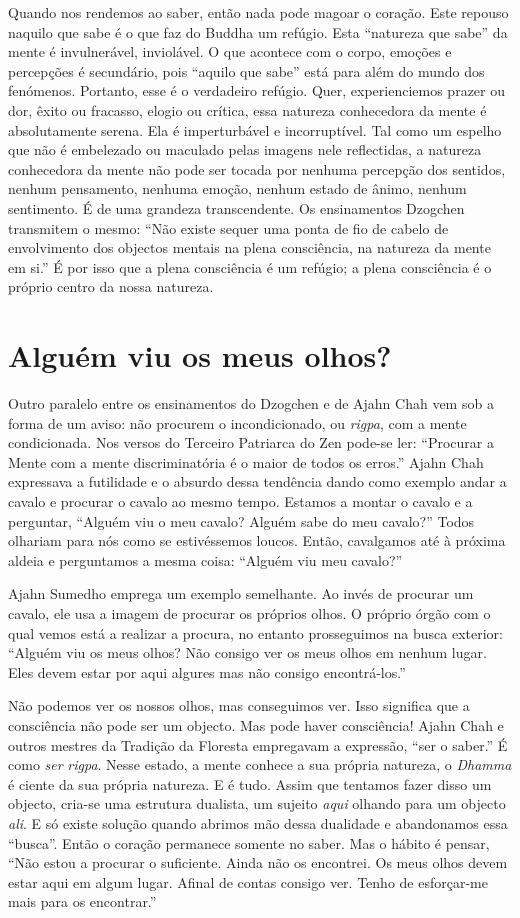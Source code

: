 Quando nos rendemos ao saber, então nada pode magoar o coração. Este
repouso naquilo que sabe é o que faz do Buddha um refúgio. Esta
``natureza que sabe'' da mente é invulnerável, inviolável. O que
acontece com o corpo, emoções e percepções é secundário, pois ``aquilo
que sabe'' está para além do mundo dos fenómenos. Portanto, esse é o
verdadeiro refúgio. Quer, experienciemos prazer ou dor, êxito ou
fracasso, elogio ou crítica, essa natureza conhecedora da mente é
absolutamente serena. Ela é imperturbável e incorruptível. Tal como um
espelho que não é embelezado ou maculado pelas imagens nele reflectidas,
a natureza conhecedora da mente não pode ser tocada por nenhuma
percepção dos sentidos, nenhum pensamento, nenhuma emoção, nenhum estado
de ânimo, nenhum sentimento. É de uma grandeza transcendente. Os
ensinamentos Dzogchen transmitem o mesmo: ``Não existe sequer uma ponta
de fio de cabelo de envolvimento dos objectos mentais na plena
consciência, na natureza da mente em si.'' É por isso que a plena
consciência é um refúgio; a plena consciência é o próprio centro da
nossa natureza.

\section{Alguém viu os meus olhos?}

Outro paralelo entre os ensinamentos do Dzogchen e de Ajahn Chah vem sob
a forma de um aviso: não procurem o incondicionado, ou \emph{rigpa}, com
a mente condicionada. Nos versos do Terceiro Patriarca do Zen pode-se
ler: ``Procurar a Mente com a mente discriminatória é o maior de todos
os erros.'' Ajahn Chah expressava a futilidade e o absurdo dessa
tendência dando como exemplo andar a cavalo e procurar o cavalo ao mesmo
tempo. Estamos a montar o cavalo e a perguntar, ``Alguém viu o meu
cavalo? Alguém sabe do meu cavalo?'' Todos olhariam para nós como se
estivéssemos loucos. Então, cavalgamos até à próxima aldeia e
perguntamos a mesma coisa: ``Alguém viu meu cavalo?''

Ajahn Sumedho emprega um exemplo semelhante. Ao invés de procurar um
cavalo, ele usa a imagem de procurar os próprios olhos. O próprio órgão
com o qual vemos está a realizar a procura, no entanto prosseguimos na
busca exterior: ``Alguém viu os meus olhos? Não consigo ver os meus
olhos em nenhum lugar. Eles devem estar por aqui algures mas não consigo
encontrá-los.''

Não podemos ver os nossos olhos, mas conseguimos ver. Isso significa que
a consciência não pode ser um objecto. Mas pode haver consciência! Ajahn
Chah e outros mestres da Tradição da Floresta empregavam a expressão,
``ser o saber.'' É como \emph{ser} \emph{rigpa}. Nesse estado, a mente
conhece a sua própria natureza, o \emph{Dhamma} é ciente da sua própria
natureza. E é tudo. Assim que tentamos fazer disso um objecto, cria-se
uma estrutura dualista, um sujeito \emph{aqui} olhando para um objecto
\emph{ali}. E só existe solução quando abrimos mão dessa dualidade e
abandonamos essa ``busca''. Então o coração permanece somente no saber.
Mas o hábito é pensar, ``Não estou a procurar o suficiente. Ainda não os
encontrei. Os meus olhos devem estar aqui em algum lugar. Afinal de
contas consigo ver. Tenho de esforçar-me mais para os encontrar.''


